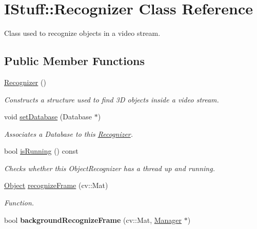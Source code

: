 \hypertarget{class_i_stuff_1_1_recognizer}{\section{I\-Stuff\-:\-:Recognizer Class Reference}
\label{class_i_stuff_1_1_recognizer}
}


Class used to recognize objects in a video stream.  


\subsection*{Public Member Functions}
\begin{DoxyCompactItemize}
\item 
\hypertarget{class_i_stuff_1_1_recognizer_a4bf77b760d8dbc50c4ef50cad433db40}{\hyperlink{class_i_stuff_1_1_recognizer_a4bf77b760d8dbc50c4ef50cad433db40}{Recognizer} ()}\label{class_i_stuff_1_1_recognizer_a4bf77b760d8dbc50c4ef50cad433db40}

\begin{DoxyCompactList}\small\item\em Constructs a structure used to find 3\-D objects inside a video stream. \end{DoxyCompactList}\item 
void \hyperlink{class_i_stuff_1_1_recognizer_a37fe89eb44d68215cab011b1962b8293}{set\-Database} (Database $\ast$)
\begin{DoxyCompactList}\small\item\em Associates a Database to this \hyperlink{class_i_stuff_1_1_recognizer}{Recognizer}. \end{DoxyCompactList}\item 
bool \hyperlink{class_i_stuff_1_1_recognizer_aac5297071c1f6ff12049a58c88bb3952}{is\-Running} () const 
\begin{DoxyCompactList}\small\item\em Checks whether this Object\-Recognizer has a thread up and running. \end{DoxyCompactList}\item 
\hypertarget{class_i_stuff_1_1_recognizer_a6505a142d08eaf1e8f6a1f95571a4c7a}{\hyperlink{class_i_stuff_1_1_object}{Object} \hyperlink{class_i_stuff_1_1_recognizer_a6505a142d08eaf1e8f6a1f95571a4c7a}{recognize\-Frame} (cv\-::\-Mat)}\label{class_i_stuff_1_1_recognizer_a6505a142d08eaf1e8f6a1f95571a4c7a}

\begin{DoxyCompactList}\small\item\em Function. \end{DoxyCompactList}\item 
\hypertarget{class_i_stuff_1_1_recognizer_ad4e54485be9385a287bc51670247b0cc}{bool {\bfseries background\-Recognize\-Frame} (cv\-::\-Mat, \hyperlink{class_i_stuff_1_1_manager}{Manager} $\ast$)}\label{class_i_stuff_1_1_recognizer_ad4e54485be9385a287bc51670247b0cc}

\end{DoxyCompactItemize}
